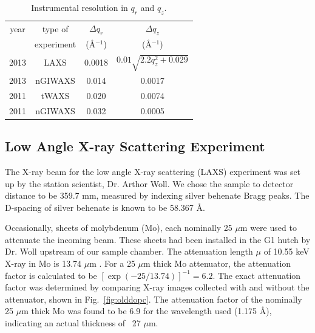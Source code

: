 \begin{table}[htbp]
  \centering
  \begin{tabular}{cccc}
    \hline
    year & type of  & $\Delta q_r$ & $\Delta q_z$ \\
       & experiment & (\AA$^{-1}$) & (\AA$^{-1}$) \\
    \hline
    2013 & LAXS    & 0.0018 & $0.01\sqrt{2.2q_z^2+0.029}$ \\
    2013 & nGIWAXS & 0.014 & 0.0017 \\
    2011 & tWAXS   & 0.020 & 0.0074 \\
    2011 & nGIWAXS & 0.032 & 0.0005\\ 
    \hline  
  \end{tabular}
  \caption{Instrumental resolution in $q_r$ and $q_z$.}
  \label{tab:instrumental_resolution}
\end{table}


\newpage
\subsection{Low Angle X-ray Scattering Experiment}\label{sec:LAXS_method}
The X-ray beam for the low angle X-ray scattering (LAXS) experiment 
was set up by the station scientist, Dr. Arthor Woll.
We chose the sample to detector distance to be 359.7 mm, measured by indexing
silver behenate Bragg peaks. The D-spacing of silver behenate is known to be
58.367 \AA.

Occasionally, sheets of molybdenum (Mo), each nominally 25 $\mu$m were 
used to attenuate the incoming beam. 
These sheets had been installed in the G1 hutch by Dr. Woll upstream of our 
sample chamber.
The attenuation length $\mu$ of 10.55 keV X-ray in Mo is 13.74 $\mu$m \cite{ref:cxro}.
For a 25 $\mu$m thick Mo attenuator, the attenuation factor is calculated to be
$[\exp(-25/13.74)]^{-1} = 6.2$. The exact attenuation factor was determined
by comparing X-ray images collected with and without the attenuator, 
shown in Fig.~\ref{fig:olddopc}.
The attenuation factor of the nominally 25 $\mu$m thick Mo was found to 
be 6.9 for the wavelength used (1.175 \AA), indicating an actual thickness
of ~27 $\mu$m. 

